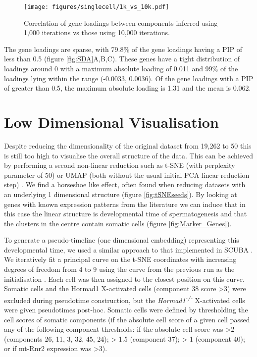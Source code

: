 \begin{figure}[H]
	\centering
	\texttt{[image: figures/singlecell/1k\_vs\_10k.pdf]}
	\caption[10k vs 1k SDA Iterations]{Correlation of gene loadings between components inferred using 1,000 iterations vs those using 10,000 iterations.}
	\label{fig:10k}
\end{figure}

The gene loadings are sparse, with 79.8\% of the gene loadings having a PIP of less than 0.5 (figure \ref{fig:SDA}A,B,C).
These genes have a tight distribution of loadings around 0 with a maximum absolute loading of 0.011 and 99\% of the loadings lying within the range (-0.0033, 0.0036).
Of the gene loadings with a PIP of greater than 0.5, the maximum absolute loading is 1.31 and the mean is 0.062.

\section{Low Dimensional Visualisation}

Despite reducing the dimensionality of the original dataset from 19,262 to 50 this is still too high to visualise the overall structure of the data.
This can be achieved by performing a second non-linear reduction such as t-SNE (with perplexity parameter of 50) or UMAP (both without the usual initial PCA linear reduction step) \parencite{Maaten2008Visualizing, McInnes2018UMAPa, Becht2018Dimensionality}.
We find a horseshoe like effect, often found when reducing datasets with an underlying 1 dimensional structure \parencite{Novembre2008Interpreting, Podani2002RESEMBLANCE} (figure \ref{fig:tSNEseeds}).
By looking at genes with known expression patterns from the literature we can induce that in this case the linear structure is developmental time of spermatogenesis and that the clusters in the centre contain somatic cells (figure \ref{fig:Marker_Genes}).

To generate a pseudo-timeline (one dimensional embedding) representing this developmental time, we used a similar approach to that implemented in SCUBA \parencite{Marco2014Bifurcation}.
We iteratively fit a principal curve on the t-SNE coordinates with increasing degrees of freedom from 4 to 9 using the curve from the previous run as the initialisation \parencite{Hastie1989Principal}.
Each cell was then assigned to the closest position on this curve.
Somatic cells and the Hormad1 X-activated cells (component 38 score >3) were excluded during pseudotime construction, but the \textit{Hormad1\textsuperscript{-/-}} X-activated cells were given pseudotimes post-hoc.
Somatic cells were defined by thresholding the cell scores of somatic components (if the absolute cell score of a given cell passed any of the following component thresholds: if the absolute cell score was >2 (components 26, 11, 3, 32, 45, 24); > 1.5 (component 37); > 1 (component 40); or if mt-Rnr2 expression was >3).

